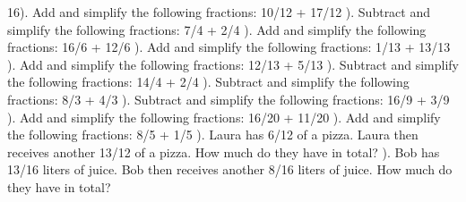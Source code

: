 \documentclass{article}%
\begin{document}
16). Add and simplify the following fractions: 10/12 + 17/12%
\newline%
\newline%
). Subtract and simplify the following fractions: 7/4 + 2/4%
\newline%
\newline%
). Add and simplify the following fractions: 16/6 + 12/6%
\newline%
\newline%
). Add and simplify the following fractions: 1/13 + 13/13%
\newline%
\newline%
). Add and simplify the following fractions: 12/13 + 5/13%
\newline%
\newline%
). Subtract and simplify the following fractions: 14/4 + 2/4%
\newline%
\newline%
). Subtract and simplify the following fractions: 8/3 + 4/3%
\newline%
\newline%
). Subtract and simplify the following fractions: 16/9 + 3/9%
\newline%
\newline%
). Add and simplify the following fractions: 16/20 + 11/20%
\newline%
\newline%
). Add and simplify the following fractions: 8/5 + 1/5%
\newline%
\newline%
). Laura has 6/12 of a pizza. Laura then receives another 13/12 of a pizza. How much do they have in total?%
\newline%
\newline%
). Bob has 13/16 liters of juice. Bob then receives another 8/16 liters of juice. How much do they have in total?%
\newline%
\newline%
\newline%
\end{document}
